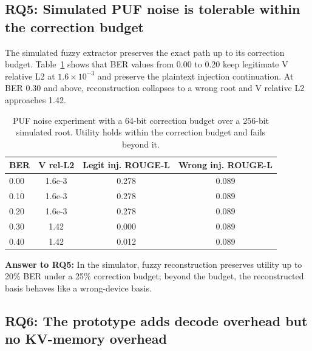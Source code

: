 \subsection{RQ5: Simulated PUF noise is tolerable within the correction budget}

The simulated fuzzy extractor preserves the exact path up to its correction budget. Table~\ref{tab:puf-noise} shows that BER values from 0.00 to 0.20 keep legitimate V relative L2 at $1.6\times 10^{-3}$ and preserve the plaintext injection continuation. At BER 0.30 and above, reconstruction collapses to a wrong root and V relative L2 approaches 1.42.

\begin{table}[t]
\centering
\caption{PUF noise experiment with a 64-bit correction budget over a 256-bit simulated root. Utility holds within the correction budget and fails beyond it.}
\label{tab:puf-noise}
\begin{tabular}{lccc}
\toprule
BER & V rel-L2 & Legit inj. ROUGE-L & Wrong inj. ROUGE-L \\
\midrule
0.00 & 1.6e-3 & 0.278 & 0.089 \\
0.10 & 1.6e-3 & 0.278 & 0.089 \\
0.20 & 1.6e-3 & 0.278 & 0.089 \\
0.30 & 1.42 & 0.000 & 0.089 \\
0.40 & 1.42 & 0.012 & 0.089 \\
\bottomrule
\end{tabular}
\end{table}

\textbf{Answer to RQ5:} In the simulator, fuzzy reconstruction preserves utility up to 20\% BER under a 25\% correction budget; beyond the budget, the reconstructed basis behaves like a wrong-device basis.

\subsection{RQ6: The prototype adds decode overhead but no KV-memory overhead}

